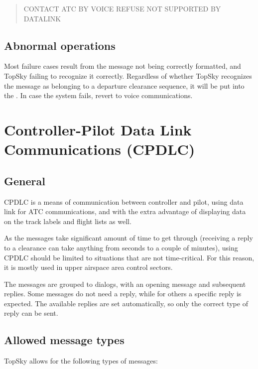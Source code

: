 \documentclass[11pt,a4paper,oldfontcommands]{memoir}
\begin{document}
\begin{quote}
  CONTACT ATC BY VOICE REFUSE NOT SUPPORTED BY DATALINK
\end{quote}

\subsection{Abnormal operations}

Most failure cases result from the message not being correctly formatted, and TopSky failing to recognize it correctly. Regardless of whether TopSky recognizes the message as belonging to a departure clearance sequence, it will be put into the \textit{}. In case the system fails, revert to voice communications.

\section{Controller-Pilot Data Link Communications (CPDLC)}
\label{cpdlc}

\subsection{General}
\label{cpdlc:gen}

CPDLC is a means of communication between controller and pilot, using data link for ATC communications, and with the extra advantage of displaying data on the track labels and flight lists as well.

As the messages take significant amount of time to get through (receiving a reply to a clearance can take anything from seconds to a couple of minutes), using CPDLC should be limited to situations that are not time-critical. For this reason, it is mostly used in upper airspace area control sectors.

The messages are grouped to dialogs, with an opening message and subsequent replies. Some messages do not need a reply, while for others a specific reply is expected. The available replies are set automatically, so only the correct type of reply can be sent.

\subsection{Allowed message types}
\label{cpdlc:amt}

TopSky allows for the following types of messages:
\end{document}
